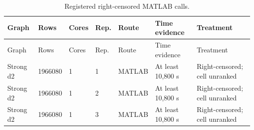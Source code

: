 \begingroup
\small
\setlength{\tabcolsep}{4pt}
\begin{longtable}{lllllll}
\caption{Registered right-censored MATLAB calls.}\label{tab:failures}\\
\toprule
Graph & Rows & Cores & Rep. & Route & Time evidence & Treatment \\
\midrule
\endfirsthead
\toprule
Graph & Rows & Cores & Rep. & Route & Time evidence & Treatment \\
\midrule
\endhead
Strong d2 & 1966080 & 1 & 1 & MATLAB & At least 10,800 s & Right-censored; cell unranked \\
Strong d2 & 1966080 & 1 & 2 & MATLAB & At least 10,800 s & Right-censored; cell unranked \\
Strong d2 & 1966080 & 1 & 3 & MATLAB & At least 10,800 s & Right-censored; cell unranked \\
\bottomrule
\end{longtable}
\endgroup
